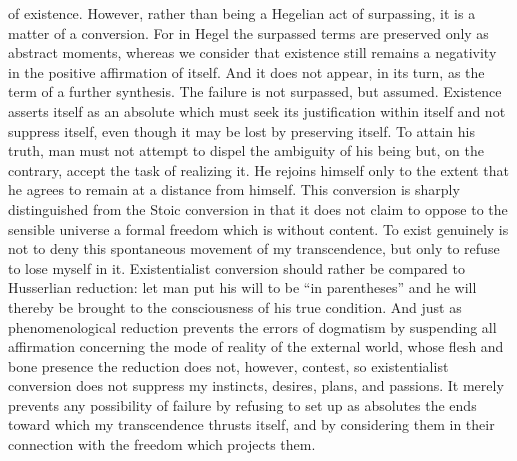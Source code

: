 \documentclass[11pt]{article}
\begin{document}
of existence. However, rather than being a Hegelian act of surpassing, it is a matter of a conversion. For in Hegel the surpassed terms are preserved only as abstract moments, whereas we consider that existence still remains a negativity in the positive affirmation of itself. And it does not appear, in its turn, as the term of a further synthesis. The failure is not surpassed, but assumed. Existence asserts itself as an absolute which must seek its justification within itself and not suppress itself, even though it may be lost by preserving itself. To attain his truth, man must not attempt to dispel the ambiguity of his being but, on the contrary, accept the task of realizing it. He rejoins himself only to the extent that he agrees to remain at a distance from himself. This conversion is sharply distinguished from the Stoic conversion in that it does not claim to oppose to the sensible universe a formal freedom which is without content. To exist genuinely is not to deny this spontaneous movement of my transcendence, but only to refuse to lose myself in it. Existentialist conversion should rather be compared to Husserlian reduction: let man put his will to be “in parentheses” and he will thereby be brought to the consciousness of his true condition. And just as phenomenological reduction prevents the errors of dogmatism by suspending all affirmation concerning the mode of reality of the external world, whose flesh and bone presence the reduction does not, however, contest, so existentialist conversion does not suppress my instincts, desires, plans, and passions. It merely prevents any possibility of failure by refusing to set up as absolutes the ends toward which my transcendence thrusts itself, and by considering them in their connection with the freedom which projects them.
\end{document}

